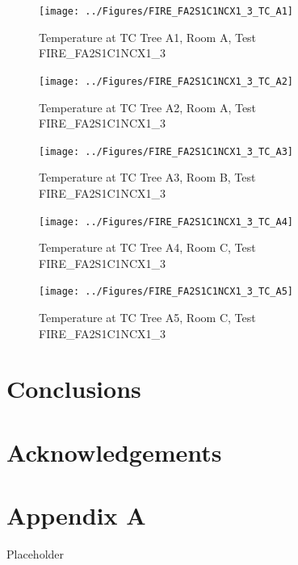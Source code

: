 \documentclass[11pt,oneside]{book}
\begin{document}
\begin{figure}[!ht]
\texttt{[image: ../Figures/FIRE\_FA2S1C1NCX1\_3\_TC\_A1]}
\caption{Temperature at TC Tree A1, Room A, Test FIRE\_FA2S1C1NCX1\_3}
\label{fig:FIRE_FA2S1C1NCX1_3_TC_A1}
\end{figure}

\begin{figure}[!ht]
\texttt{[image: ../Figures/FIRE\_FA2S1C1NCX1\_3\_TC\_A2]}
\caption{Temperature at TC Tree A2, Room A, Test FIRE\_FA2S1C1NCX1\_3}
\label{fig:FIRE_FA2S1C1NCX1_3_TC_A2}
\end{figure}

\begin{figure}[!ht]
\texttt{[image: ../Figures/FIRE\_FA2S1C1NCX1\_3\_TC\_A3]}
\caption{Temperature at TC Tree A3, Room B, Test FIRE\_FA2S1C1NCX1\_3}
\label{fig:FIRE_FA2S1C1NCX1_3_TC_A3}
\end{figure}

\begin{figure}[!ht]
\texttt{[image: ../Figures/FIRE\_FA2S1C1NCX1\_3\_TC\_A4]}
\caption{Temperature at TC Tree A4, Room C, Test FIRE\_FA2S1C1NCX1\_3}
\label{fig:FIRE_FA2S1C1NCX1_3_TC_A4}
\end{figure}

\begin{figure}[!ht]
\texttt{[image: ../Figures/FIRE\_FA2S1C1NCX1\_3\_TC\_A5]}
\caption{Temperature at TC Tree A5, Room C, Test FIRE\_FA2S1C1NCX1\_3}
\label{fig:FIRE_FA2S1C1NCX1_3_TC_A5}
\end{figure}


\clearpage


\chapter{Conclusions}
\label{chap:Conclusions}

\chapter{Acknowledgements}
\label{chap:Acknowledgements}



\appendix

\chapter{Appendix A}

Placeholder
\end{document}
